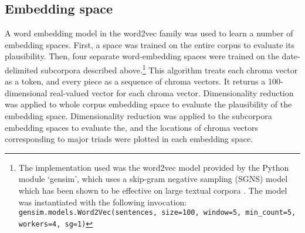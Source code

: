 \subsection{Embedding space}\label{embedding-space}

A word embedding model in the word2vec family was used to learn a number of embedding
spaces. First, a space was trained on the entire corpus to evaluate its plausibility. Then, four separate word-embedding spaces were trained on the date-delimited subcorpora described above.\footnote{The implementation used was the word2vec model provided by the Python module `gensim', which uses a skip-gram negative sampling (SGNS) model which has been shown to be effective on large textual corpora \cite{rehurek_lrec}. The model was instantiated with the following invocation: \texttt{gensim.models.Word2Vec(sentences, size=100, window=5, min\_count=5, workers=4, sg=1)}}
This algorithm treats each chroma vector as a token, and every piece as a sequence of chroma vectors. It returns a 100-dimensional real-valued vector for each chroma vector. Dimensionality reduction was applied to whole corpus embedding space to evaluate the plausibility of the embedding space. Dimensionality reduction was applied to the subcorpora embedding spaces to evaluate the, and the locations of chroma vectors corresponding to major triads were plotted in each embedding space.
